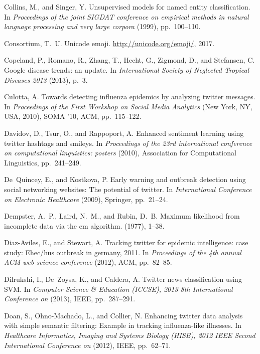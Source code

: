 \documentclass[10pt,letterpaper]{article}
\begin{document}
\begin{thebibliography}{10}
{\sc Collins, M., and Singer, Y.}
\newblock Unsupervised models for named entity classification.
\newblock In {\em Proceedings of the joint SIGDAT conference on empirical
  methods in natural language processing and very large corpora\/} (1999),
  pp.~100--110.

{\sc Consortium, T.~U.}
\newblock Unicode emoji.
\newblock \url{http://unicode.org/emoji/}, 2017.

{\sc Copeland, P., Romano, R., Zhang, T., Hecht, G., Zigmond, D., and
  Stefansen, C.}
\newblock Google disease trends: an update.
\newblock In {\em International Society of Neglected Tropical Diseases 2013\/}
  (2013), p.~3.

{\sc Culotta, A.}
\newblock Towards detecting influenza epidemics by analyzing twitter messages.
\newblock In {\em Proceedings of the First Workshop on Social Media
  Analytics\/} (New York, NY, USA, 2010), SOMA '10, ACM, pp.~115--122.

{\sc Davidov, D., Tsur, O., and Rappoport, A.}
\newblock Enhanced sentiment learning using twitter hashtags and smileys.
\newblock In {\em Proceedings of the 23rd international conference on
  computational linguistics: posters\/} (2010), Association for Computational
  Linguistics, pp.~241--249.

{\sc De~Quincey, E., and Kostkova, P.}
\newblock Early warning and outbreak detection using social networking
  websites: The potential of twitter.
\newblock In {\em International Conference on Electronic Healthcare\/} (2009),
  Springer, pp.~21--24.

{\sc Dempster, A.~P., Laird, N.~M., and Rubin, D.~B.}
\newblock Maximum likelihood from incomplete data via the em algorithm.
 (1977), 1--38.

{\sc Diaz-Aviles, E., and Stewart, A.}
\newblock Tracking twitter for epidemic intelligence: case study: Ehec/hus
  outbreak in germany, 2011.
\newblock In {\em Proceedings of the 4th annual ACM web science conference\/}
  (2012), ACM, pp.~82--85.

{\sc Dilrukshi, I., De~Zoysa, K., and Caldera, A.}
\newblock Twitter news classification using {SVM}.
\newblock In {\em Computer Science \& Education (ICCSE), 2013 8th International
  Conference on\/} (2013), IEEE, pp.~287--291.

{\sc Doan, S., Ohno-Machado, L., and Collier, N.}
\newblock Enhancing twitter data analysis with simple semantic filtering:
  Example in tracking influenza-like illnesses.
\newblock In {\em Healthcare Informatics, Imaging and Systems Biology (HISB),
  2012 IEEE Second International Conference on\/} (2012), IEEE, pp.~62--71.


\end{thebibliography}
\end{document}
